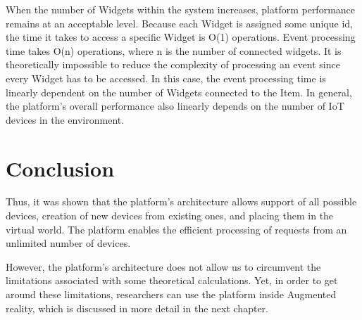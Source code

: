 When the number of Widgets within the system increases, platform performance remains at an acceptable level. Because each Widget is assigned some unique id, the time it takes to access a specific Widget is O(1) operations. Event processing time takes O(n) operations, where n is the number of connected widgets. It is theoretically impossible to reduce the complexity of processing an event since every Widget has to be accessed. In this case, the event processing time is linearly dependent on the number of Widgets connected to the Item. In general, the platform's overall performance also linearly depends on the number of IoT devices in the environment.

\section{Conclusion}

Thus, it was shown that the platform's architecture allows support of all possible devices, creation of new devices from existing ones, and placing them in the virtual world. The platform enables the efficient processing of requests from an unlimited number of devices.

However, the platform's architecture does not allow us to circumvent the limitations associated with some theoretical calculations. Yet, in order to get around these limitations, researchers can use the platform inside Augmented reality, which is discussed in more detail in the next chapter.